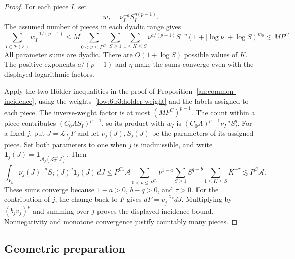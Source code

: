 \documentclass[11pt]{amsart}
\theoremstyle{definition}
\theoremstyle{remark}
\numberwithin{equation}{section}
\begin{document}
\begin{proof}
For each piece $I$, set
\begin{equation}\label{low:6:r3:holder-weight}
w_I=\nu_I^{-a}S_I^{\eta(p-1)}.
\end{equation}
The assumed number of pieces in each dyadic range gives
\begin{equation}\label{low:6:r3:inverse-sum}
\sum_{I\in\mathscr P(F)}w_I^{-1/(p-1)}
\le M\sum_{0<\nu\le P^{C_*}}\sum_{S\ge1}\sum_{1\le K\le S}\nu^{a/(p-1)}S^{-\eta}(1+|\log\nu|+\log S)^{m_0}
\lesssim MP^C.
\end{equation}
All parameter sums are dyadic. There are $O(1+\log S)$ possible values of $K$. The positive exponents $a/(p-1)$ and $\eta$ make the sums converge even with the displayed logarithmic factors.

Apply the two H\"older inequalities in the proof of Proposition~\ref{an:common-incidence}, using the weights~\eqref{low:6:r3:holder-weight} and the labels assigned to each piece. The inverse-weight factor is at most $(MP^C)^{p-1}$. The count within a piece contributes $(C_0\Lambda S_I)^{p-1}$, so its product with $w_I$ is $(C_0\Lambda)^{p-1}\nu_I^{-a}S_I^q$. For a fixed $j$, put $J=\mathcal L_{T_j}F$ and let $\nu_j(J),S_j(J)$ be the parameters of its assigned piece. Set both parameters to one when $j$ is inadmissible, and write $\mathbf1_j(J)=\mathbf1_{\mathcal A_j(\mathcal L_{T_j}^{-1}J)}$. Then
\begin{equation}\label{low:6:r3:anchored-sum}
\int_{V_k}\nu_j(J)^{-a}S_j(J)^q\mathbf1_j(J)\,dJ
\le P^{C_*}\mathcal A\sum_{0<\nu\le P^{C_*}}\nu^{1-a}\sum_{S\ge1}S^{q-b}\sum_{1\le K\le S}K^{-\tau}
\lesssim P^C\mathcal A.
\end{equation}
These sums converge because $1-a>0$, $b-q>0$, and $\tau>0$. For the contribution of $j$, the change back to $F$ gives $dF=v_j^{-\chi_k}dJ$. Multiplying by $(b_jv_j)^p$ and summing over $j$ proves the displayed incidence bound. Nonnegativity and monotone convergence justify countably many pieces.
\end{proof}

\subsection{Geometric preparation}\label{app:shared-geometry}
\end{document}
